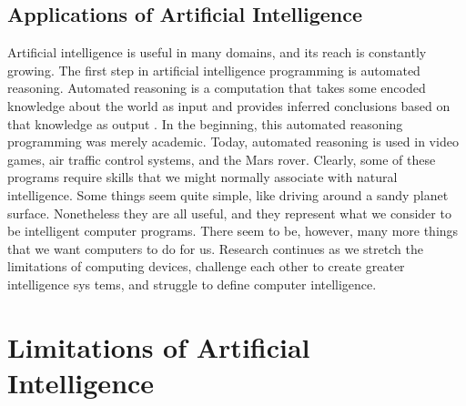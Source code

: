     \subsection{Applications of Artificial Intelligence}

    Artificial intelligence is useful in many domains, and its reach is constantly
growing. The first step in artificial intelligence programming is automated reasoning.
Automated reasoning is a computation that takes some encoded knowledge about the
world as input and provides inferred conclusions based on that knowledge as output
\cite{four}. In the beginning, this automated reasoning programming was merely
academic. Today, automated reasoning is used in video games, air traffic control
systems, and the Mars rover.
Clearly, some of these programs require skills that we might normally associate
with natural intelligence. Some things seem quite simple, like driving around a sandy
planet surface. Nonetheless they are all useful, and they represent what we consider to be
intelligent computer programs. There seem to be, however, many more things that we want computers to do for us. Research continues as we stretch the limitations of
computing devices, challenge each other to create greater intelligence sys tems, and
struggle to define computer intelligence.

\section{Limitations of Artificial Intelligence}
    
